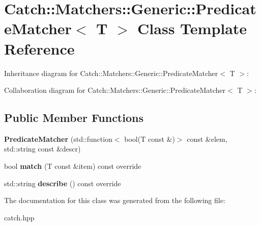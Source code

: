 \hypertarget{classCatch_1_1Matchers_1_1Generic_1_1PredicateMatcher}{}\section{Catch\+:\+:Matchers\+:\+:Generic\+:\+:Predicate\+Matcher$<$ T $>$ Class Template Reference}
\label{classCatch_1_1Matchers_1_1Generic_1_1PredicateMatcher}


Inheritance diagram for Catch\+:\+:Matchers\+:\+:Generic\+:\+:Predicate\+Matcher$<$ T $>$\+:


Collaboration diagram for Catch\+:\+:Matchers\+:\+:Generic\+:\+:Predicate\+Matcher$<$ T $>$\+:
\subsection*{Public Member Functions}
\begin{DoxyCompactItemize}
\item 
{\bfseries Predicate\+Matcher} (std\+::function$<$ bool(T const \&)$>$ const \&elem, std\+::string const \&descr)\hypertarget{classCatch_1_1Matchers_1_1Generic_1_1PredicateMatcher_a57d53ef028c2f7b92b016f627f91aa76}{}\label{classCatch_1_1Matchers_1_1Generic_1_1PredicateMatcher_a57d53ef028c2f7b92b016f627f91aa76}

\item 
bool {\bfseries match} (T const \&item) const override\hypertarget{classCatch_1_1Matchers_1_1Generic_1_1PredicateMatcher_a2ec0e8ec19c4c5e26271d59a06a62b52}{}\label{classCatch_1_1Matchers_1_1Generic_1_1PredicateMatcher_a2ec0e8ec19c4c5e26271d59a06a62b52}

\item 
std\+::string {\bfseries describe} () const override\hypertarget{classCatch_1_1Matchers_1_1Generic_1_1PredicateMatcher_af7d59e94892cc09471bbaefac4c889fd}{}\label{classCatch_1_1Matchers_1_1Generic_1_1PredicateMatcher_af7d59e94892cc09471bbaefac4c889fd}

\end{DoxyCompactItemize}


The documentation for this class was generated from the following file\+:\begin{DoxyCompactItemize}
\item 
catch.\+hpp\end{DoxyCompactItemize}
